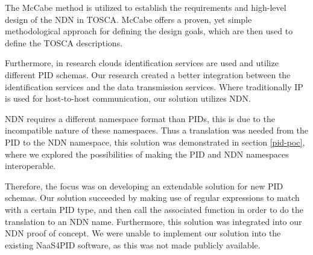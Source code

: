 The McCabe method \cite{mccabe2010network} is utilized to establish the requirements and high-level design of the NDN in TOSCA. McCabe offers a proven, yet simple methodological approach for defining the design goals, which are then used to define the TOSCA descriptions.

Furthermore, in research clouds identification services are used and utilize different PID schemas. Our research created a better integration between the identification services and the data transmission services. Where traditionally IP is used for host-to-host communication, our solution utilizes NDN.







NDN requires a different namespace format than PIDs, this is due to the incompatible nature of these namespaces. Thus a translation was needed from the PID to the NDN namespace, this solution was demonstrated in section \ref{pid-poc}, where we explored the possibilities of making the PID and NDN namespaces interoperable.

Therefore, the focus was on developing an extendable solution for new PID schemas. Our solution succeeded by making use of regular expressions to match with a certain PID type, and then call the associated function in order to do the translation to an NDN name. Furthermore, this solution was integrated into our NDN proof of concept. We were unable to implement our solution into the existing NaaS4PID software, as this was not made publicly available.

